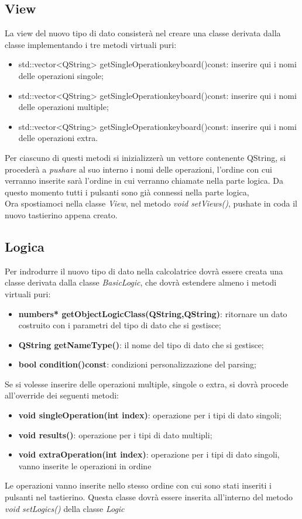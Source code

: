\documentclass[a4paper,10pt]{article}
\begin{document}
        \subsection{View}
        La view del nuovo tipo di dato consisterà nel creare una classe derivata dalla classe  implementando i tre metodi virtuali puri:
        \begin{itemize}
            \item std::vector<QString> getSingleOperationkeyboard()const: inserire qui i nomi delle operazioni singole;
            \item std::vector<QString> getSingleOperationkeyboard()const: inserire qui i nomi delle operazioni multiple;
            \item std::vector<QString> getSingleOperationkeyboard()const: inserire qui i nomi delle operazioni extra.
        \end{itemize}
        Per ciascuno di questi metodi si inizializzerà un vettore contenente QString, si procederà a \textit{pushare} al suo interno i nomi delle operazioni, l'ordine con cui verranno inserite sarà l'ordine in cui verranno chiamate nella parte logica. Da questo momento tutti i pulsanti sono già connessi nella parte logica, \\
        Ora spostiamoci nella classe \textit{View}, nel metodo \textit{void setViews()}, pushate in coda il nuovo tastierino appena creato.
        \subsection{Logica}
        Per indrodurre il nuovo tipo di dato nella calcolatrice dovrà essere creata una classe derivata dalla classe \textit{BasicLogic}, che dovrà estendere almeno i metodi virtuali puri:
        \begin{itemize}
            \item \textbf{numbers* getObjectLogicClass(QString,QString)}: ritornare un dato costruito con i parametri del tipo di dato che si gestisce; 
            \item \textbf{QString getNameType()}: il nome del tipo di dato che si gestisce;
            \item \textbf{bool condition()const}: condizioni personalizzazione del parsing;
        \end{itemize}
        Se si volesse inserire delle operazioni multiple, singole o extra, si dovrà procede all'override dei seguenti metodi:
        \begin{itemize}
            \item \textbf{void singleOperation(int index)}: operazione per i tipi di dato singoli;
            \item \textbf{void results()}: operazione per i tipi di dato multipli;
            \item \textbf{void extraOperation(int index)}: operazione per i tipi di dato singoli, vanno inserite le operazioni in ordine 
        \end{itemize}
        Le operazioni vanno inserite nello stesso ordine con cui sono stati inseriti i pulsanti nel tastierino.
        Questa classe dovrà essere inserita all'interno del metodo \textit{void setLogics()} della classe \textit{Logic}
\end{document}
